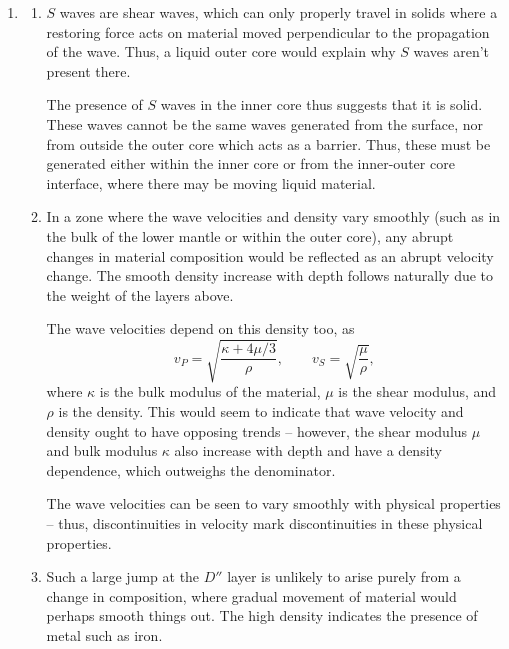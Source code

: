 \documentclass[10pt]{article}
\begin{document}
\begin{enumerate}
        \item \begin{enumerate}
            \item $S$ waves are shear waves, which can only properly travel in
            solids where a restoring force acts on material moved perpendicular to
            the propagation of the wave. Thus, a liquid outer core would explain why
            $S$ waves aren't present there.
            
            The presence of $S$ waves in the inner core thus suggests that it is
            solid. These waves cannot be the same waves generated from the surface,
            nor from outside the outer core which acts as a barrier. Thus, these
            must be generated either within the inner core or from the inner-outer
            core interface, where there may be moving liquid material.

            \item In a zone where the wave velocities and density vary smoothly
            (such as in the bulk of the lower mantle or within the outer core), any
            abrupt changes in material composition would be reflected as an abrupt
            velocity change. The smooth density increase with depth follows
            naturally due to the weight of the layers above.

            The wave velocities depend on this density too, as \[
                v_P = \sqrt{\frac{\kappa + 4\mu /3}{\rho}}, \qquad
                v_S = \sqrt{\frac{\mu}{\rho}},
            \] where $\kappa$ is the bulk modulus of the material, $\mu$ is the
            shear modulus, and $\rho$ is the density.
            This would seem to indicate that wave velocity and density ought to have
            opposing trends -- however, the shear modulus $\mu$ and bulk modulus
            $\kappa$ also increase with depth and have a density dependence, which
            outweighs the denominator.

            The wave velocities can be seen to vary smoothly with physical
            properties -- thus, discontinuities in velocity mark discontinuities in
            these physical properties.

            \item Such a large jump at the $D''$ layer is unlikely to arise purely
            from a change in composition, where gradual movement of material would
            perhaps smooth things out. The high density indicates the presence of
            metal such as iron.


\end{enumerate}
\end{enumerate}
\end{document}

